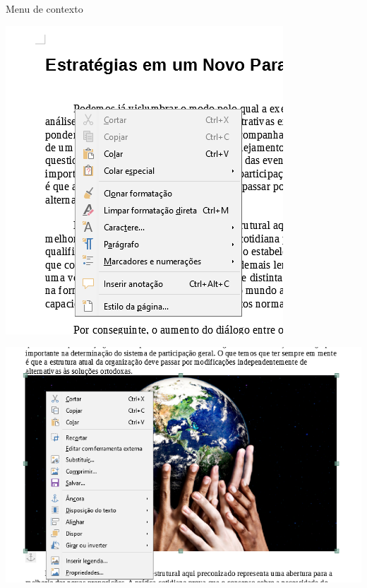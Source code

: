 \begin{frame}{Menu de contexto}

	\begin{minipage}{0.49\linewidth}
		\centering
		\includegraphics[width=1\linewidth]{Figuras/Ch04/fig17}
	\end{minipage}\hfill
	\begin{minipage}{0.49\linewidth}
		\centering
		\includegraphics[width=1\linewidth]{Figuras/Ch04/fig18}
	\end{minipage}
\end{frame}


